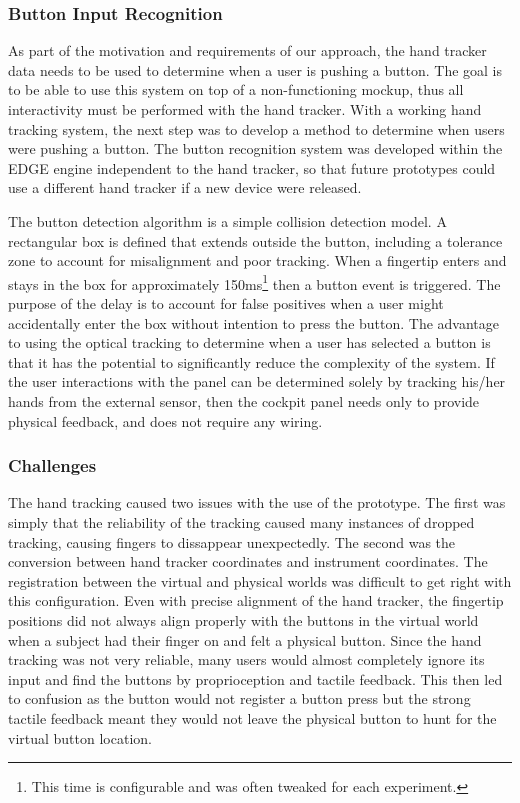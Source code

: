 \subsubsection{Button Input Recognition}

As part of the motivation and requirements of our approach, the hand tracker data needs to be used to determine when a user is pushing a button.
The goal is to be able to use this system on top of a non-functioning mockup, thus all interactivity must be performed with the hand tracker.
With a working hand tracking system, the next step was to develop a method to determine when users were pushing a button.
The button recognition system was developed within the EDGE engine independent to the hand tracker, so that future prototypes could use a different hand tracker if a new device were released.

The button detection algorithm is a simple collision detection model.
A rectangular box is defined that extends outside the button, including a tolerance zone to account for misalignment and poor tracking.
When a fingertip enters and stays in the box for approximately 150ms\footnote{This time is configurable and was often tweaked for each experiment.} then a button event is triggered.
The purpose of the delay is to account for false positives when a user might accidentally enter the box without intention to press the button.
The advantage to using the optical tracking to determine when a user has selected a button is that it has the potential to significantly reduce the complexity of the system.
If the user interactions with the panel can be determined solely by tracking his/her hands from the external sensor, then the cockpit panel needs only to provide physical feedback, and does not require any wiring.

\subsubsection{Challenges}

The hand tracking caused two issues with the use of the prototype.
The first was simply that the reliability of the tracking caused many instances of dropped tracking, causing fingers to dissappear unexpectedly.
The second was the conversion between hand tracker coordinates and instrument coordinates.
The registration between the virtual and physical worlds was difficult to get right with this configuration.
Even with precise alignment of the hand tracker, the fingertip positions did not always align properly with the buttons in the virtual world when a subject had their finger on and felt a physical button.
Since the hand tracking was not very reliable, many users would almost completely ignore its input and find the buttons by proprioception and tactile feedback.
This then led to confusion as the button would not register a button press but the strong tactile feedback meant they would not leave the physical button to hunt for the virtual button location.

